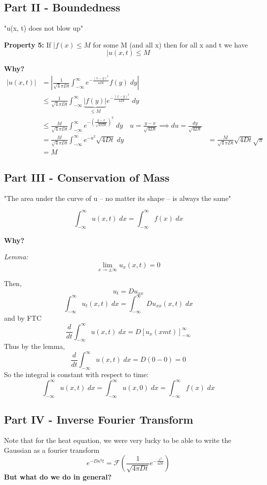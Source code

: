 \documentclass[12pt]{article}
\newcommand{\F}[1]{\mathcal{F}\left(#1\right)}
\begin{document}
\subsection*{Part II - Boundedness}
"u(x, t) does not blow up"

\textbf{Property 5: } If $|f(x) \leq M$ for some M (and all x) then for all x and t we have 
\[|u(x, t) \leq M\]

\textbf{Why?}
\begin{align*}
    |u(x, t)| &= \left|\frac{1}{\sqrt4\pi D t} \int_{-\infty}^\infty e^{-\frac{(x - y)^2}{4Dt}} f(y) \; dy\right|\\
    &\leq \frac{1}{\sqrt4\pi D t} \int_{-\infty}^\infty \underbrace{|f(y)|}_{\leq M} e^{-\frac{(x - y)^2}{4Dt}}\; dy\\
    &\leq \frac{M}{\sqrt4\pi Dt} \int_{-\infty}^\infty e^{-\left(\frac{y - x}{\sqrt{4\pi Dt}}\right)^2}\; dy \quad u = \frac{y - x}{\sqrt{4Dt}} \implies du = \frac{dy}{\sqrt{4Dt}}\\
    &= \frac{M}{\sqrt4\pi Dt} \int_{-\infty}^\infty e^{-u^2}\sqrt{4Dt}\; dy 
    &= \frac{M}{\sqrt4\pi Dt} \sqrt{4Dt} \sqrt{\pi}\\
    &= M
\end{align*}

\subsection*{Part III - Conservation of Mass}
"The area under the curve of u -- no matter its shape -- is always the same"

\[\int_{-\infty}^\infty u(x, t)\; dx =\int_{-\infty}^\infty f(x) \; dx \]

\textbf{Why?}

\emph{Lemma:} 
\[\lim_{x \to \pm \infty} u_x(x, t) = 0\]

Then,
\[u_t = Du_{xx}\]
\[\int_{-\infty}^\infty u_t(x, t)\; dx = \int_{-\infty}^\infty Du_{xx}(x, t)\; dx\]
and by FTC 
\[\frac{d}{dt}\int_{-\infty}^\infty u(x, t) \; dx = D\left[u_x(xm t)\right]_{-\infty}^\infty\]
Thus by the lemma,
\[\frac{d}{dt}\int_{-\infty}^\infty u(x, t) \; dx = D(0- 0) = 0\]
So the integral is constant with respect to time:
\[\int_{-\infty}^\infty u(x, t) \; dx = \int_{-\infty}^\infty u(x, 0) \; dx =\int_{-\infty}^\infty f(x) \; dx\]

\subsection*{Part IV - Inverse Fourier Transform}
Note that for the heat equation, we were very lucky to be able to write the Gaussian as a fourier transform
\[e^{-D\kappa^2t} = \F{\frac{1}{\sqrt{4\pi Dt}}e^{-\frac{x^2}{4Dt}}}\]
\textbf{But what do we do in general?}
\end{document}
